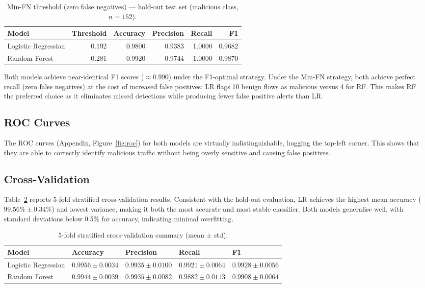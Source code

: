 \documentclass[11pt]{article}
\begin{document}
\begin{table}[H]
\centering
\caption{Min-FN threshold (zero false negatives) --- hold-out test set (malicious class, $n=152$).}
\label{tab:test_minfn}
\begin{tabular}{lrrrrr}
\toprule
\textbf{Model} & \textbf{Threshold} & \textbf{Accuracy} & \textbf{Precision} & \textbf{Recall} & \textbf{F1} \\
\midrule
Logistic Regression  & 0.192 & 0.9800 & 0.9383 & 1.0000 & 0.9682 \\
Random Forest        & 0.281 & 0.9920 & 0.9744 & 1.0000 & 0.9870 \\
\bottomrule
\end{tabular}
\end{table}

Both models achieve near-identical F1 scores ($\approx 0.990$) under the
F1-optimal strategy. Under the Min-FN strategy, both achieve perfect recall
(zero false negatives) at the cost of increased false positives: LR flags 10
benign flows as malicious versus 4 for RF. This makes RF the preferred choice
as it eliminates missed detections while
producing fewer false positive alerts than LR.

\subsection{ROC Curves}

The ROC curves (Appendix, Figure~\ref{fig:roc}) for both models are virtually
indistinguishable, hugging the top-left corner. This shows that they are able to correctly identify malicious traffic without being overly sensitive and causing false positives.

\subsection{Cross-Validation}

Table~\ref{tab:cv} reports 5-fold stratified cross-validation results.
Consistent with the hold-out evaluation, LR achieves the highest mean
accuracy ($99.56\% \pm 0.34\%$) and lowest variance, making it both the most
accurate and most stable classifier. Both models generalise well, with
standard deviations below 0.5\% for accuracy, indicating minimal overfitting.

\begin{table}[H]
\centering
\caption{5-fold stratified cross-validation summary (mean $\pm$ std).}
\label{tab:cv}
\begin{tabular}{lllll}
\toprule
\textbf{Model} & \textbf{Accuracy} & \textbf{Precision} & \textbf{Recall} & \textbf{F1} \\
\midrule
Logistic Regression
    & $0.9956\pm0.0034$ & $0.9935\pm0.0100$ & $0.9921\pm0.0064$ & $0.9928\pm0.0056$ \\
Random Forest
    & $0.9944\pm0.0039$ & $0.9935\pm0.0082$ & $0.9882\pm0.0113$ & $0.9908\pm0.0064$ \\
\bottomrule
\end{tabular}
\end{table}
\end{document}
